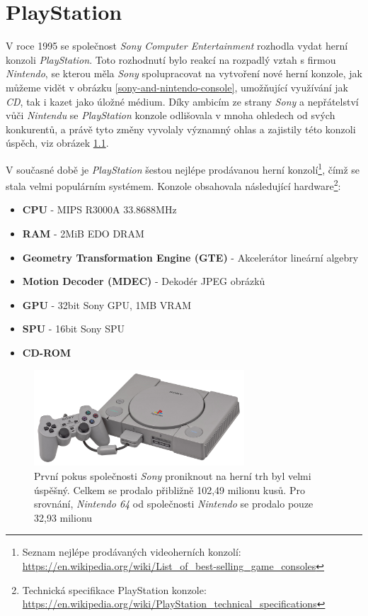 \chapter{PlayStation}

V roce 1995 se společnost \textit{Sony Computer Entertainment} rozhodla vydat herní konzoli \textit{PlayStation}. 
Toto rozhodnutí bylo reakcí na rozpadlý vztah s firmou \textit{Nintendo}, se kterou měla \textit{Sony} spolupracovat na vytvoření nové herní konzole, jak můžeme vidět v obrázku \ref{sony-and-nintendo-console}, 
umožňující využívání jak \textit{CD}, tak i kazet jako úložné médium. 
Díky ambicím ze strany \textit{Sony} a nepřátelství vůči \textit{Nintendu} se \textit{PlayStation} konzole odlišovala v mnoha ohledech od svých konkurentů, 
a právě tyto změny vyvolaly významný ohlas a zajistily této konzoli úspěch, viz obrázek \ref{psx-console}.

V současné době je \textit{PlayStation} šestou nejlépe prodávanou herní konzolí\footnote{Seznam nejlépe prodávaných videoherních konzolí: \url{https://en.wikipedia.org/wiki/List_of_best-selling_game_consoles}}, čímž se stala velmi populárním systémem. 
Konzole obsahovala následující hardware\footnote{Technická specifikace PlayStation konzole: \newline \url{https://en.wikipedia.org/wiki/PlayStation_technical_specifications}}:

\begin{itemize}
    \label{Specifikace Hardwaru}
    \item{\textbf{CPU} - MIPS R3000A 33.8688MHz}
    \item{\textbf{RAM} - 2MiB EDO DRAM}
    \item{\textbf{Geometry Transformation Engine (GTE)} - Akcelerátor lineární algebry}
    \item{\textbf{Motion Decoder (MDEC)} - Dekodér JPEG obrázků}
    \item{\textbf{GPU} - 32bit Sony GPU, 1MB VRAM}
    \item{\textbf{SPU} - 16bit Sony SPU}
    \item{\textbf{CD-ROM}}
\end{itemize}

\begin{figure}[hbt]
	\centering
	\includegraphics[width=0.7\textwidth]{obrazky-figures/psx-console.jpg}
	\caption[Úspěch \textit{PlayStation 1}]{První pokus společnosti \textit{Sony} proniknout na herní trh byl velmi úspěšný. Celkem se prodalo přibližně 102,49 milionu kusů. Pro srovnání, \textit{Nintendo 64} od společnosti \textit{Nintendo} se prodalo pouze 32,93 milionu}
	\label{psx-console}
\end{figure}


